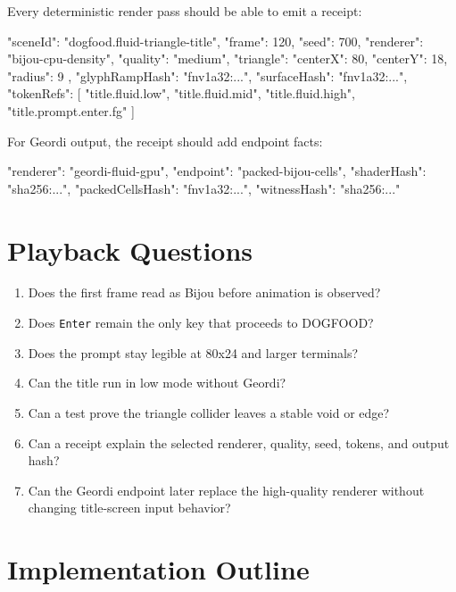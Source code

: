 Every deterministic render pass should be able to emit a receipt:

\begin{CodeBlock}
{
  "sceneId": "dogfood.fluid-triangle-title",
  "frame": 120,
  "seed": 700,
  "renderer": "bijou-cpu-density",
  "quality": "medium",
  "triangle": { "centerX": 80, "centerY": 18, "radius": 9 },
  "glyphRampHash": "fnv1a32:...",
  "surfaceHash": "fnv1a32:...",
  "tokenRefs": [
    "title.fluid.low",
    "title.fluid.mid",
    "title.fluid.high",
    "title.prompt.enter.fg"
  ]
}
\end{CodeBlock}

For Geordi output, the receipt should add endpoint facts:

\begin{CodeBlock}
{
  "renderer": "geordi-fluid-gpu",
  "endpoint": "packed-bijou-cells",
  "shaderHash": "sha256:...",
  "packedCellsHash": "fnv1a32:...",
  "witnessHash": "sha256:..."
}
\end{CodeBlock}

\section{Playback Questions}\label{record-114-playback-questions}

\begin{enumerate}
\def\labelenumi{\arabic{enumi}.}
\tightlist
\item
  Does the first frame read as Bijou before animation is observed?
\item
  Does \texttt{E\allowbreak{}n\allowbreak{}t\allowbreak{}e\allowbreak{}r} remain the only key that proceeds to DOGFOOD?
\item
  Does the prompt stay legible at 80x24 and larger terminals?
\item
  Can the title run in low mode without Geordi?
\item
  Can a test prove the triangle collider leaves a stable void or edge?
\item
  Can a receipt explain the selected renderer, quality, seed, tokens, and output hash?
\item
  Can the Geordi endpoint later replace the high-quality renderer without changing title-screen input behavior?
\end{enumerate}

\section{Implementation Outline}\label{record-114-implementation-outline}


